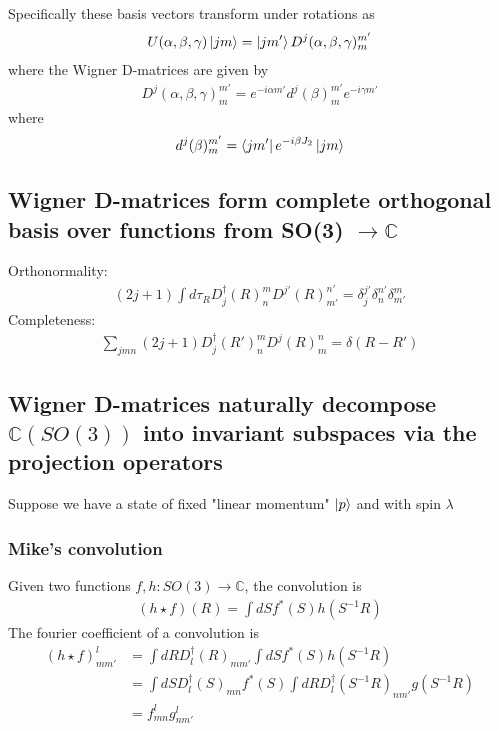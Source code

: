 \documentclass{article}
\begin{document}
Specifically these basis vectors transform under rotations as 
\begin{align}
    U(\alpha,\beta,\gamma)\ket{jm} = \ket{jm'}D^j(\alpha,\beta,\gamma)^{m'}_m
\end{align}
where the Wigner D-matrices are given by 
\begin{align}
    D^j(\alpha,\beta,\gamma)^{m'}_m = e^{-i\alpha m'}d^j(\beta)^{m'}_m e^{-i\gamma m'}
\end{align}
where
\begin{align}
    d^j(\beta)^{m'}_m = \bra{jm'}e^{-i\beta J_2}\ket{jm}
\end{align}

\subsection{Wigner D-matrices form complete orthogonal basis over functions from SO(3) $\rightarrow \mathbb{C}$}

Orthonormality:
\begin{align}
    (2j+1)\int d\tau_R D^{\dagger}_j(R)^m_n D^{j'}(R)^{n'}_{m'} = \delta^{j'}_j\delta^{n'}_n\delta^{m}_{m'}
\end{align}
Completeness:
\begin{align}
    \sum_{jmn}(2j+1)D^{\dagger}_j(R')^m_n D^{j}(R)^{n}_{m} = \delta(R - R')
\end{align}

\subsection{Wigner D-matrices naturally decompose $\mathbb{C}(SO(3))$ into invariant subspaces via the projection operators}

Suppose we have a state of fixed "linear momentum" $\ket{p}$ and with spin $\lambda$


\subsubsection{Mike's convolution}
Given two functions $f,h:SO(3)\rightarrow \mathbb{C}$, the convolution is 
\begin{align}
    (h\star f)(R) = \int dS f^{*}(S)h(S^{-1}R)
\end{align}
The fourier coefficient of a convolution is
\begin{align}
    (h \star f)^{l}_{mm'} &= \int dR D^{\dagger}_l(R)_{mm'} \int dS f^{*}(S)h(S^{-1}R)\\
    &= \int dS D^{\dagger}_l(S)_{mn} f^{*}(S) \int dR D^{\dagger}_l(S^{-1}R)_{nm'} g(S^{-1}R)\\
    &= f^{l}_{mn}g^l_{nm'}
\end{align}
\end{document}
